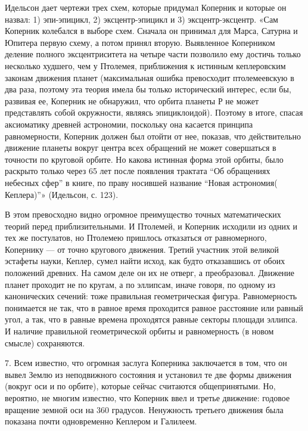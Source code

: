 Идельсон дает чертежи  трех схем, которые придумал  Коперник и которые
он назвал: 1) эпи-эпицикл, 2) эксцентр-эпицикл и 3) эксцентр-эксцентр.
«Сам Коперник колебался в выборе  схем. Сначала он принимал для Марса,
Сатурна  и Юпитера  первую схему,  а потом  принял вторую.  Выявленное
Коперником деление  полного эксцентриситета на четыре  части позволило
ему достичь  только несколько худшего,  чем у Птолемея,  приближения к
истинным  кеплеровским законам  движения  планет (максимальная  ошибка
превосходит  птолемеевскую  в  два  раза,  поэтому  эта  теория  имела
бы  только  исторический  интерес,  если  бы,  развивая  ее,  Коперник
не  обнаружил,  что  орбита  планеты Р  не  может  представлять  собой
окружности, являясь эпициклоидой). Поэтому в итоге, спасая аксиоматику
древней  астрономии, поскольку  она  касается принципа  равномерности,
Коперник  должен  был  отойти   от  нее,  показав,  что  действительно
движение планеты вокруг  центра всех обращений не  может совершаться в
точности по  круговой орбите.  Но какова  истинная форма  этой орбиты,
было  раскрыто  только через  65  лет  после появления  трактата  ``Об
обращениях небесных сфер'' в книге, по праву носившей название ``Новая
астрономия( Кеплера)''» (Идельсон, с. 123).

В этом  превосходно видно огромное преимущество  точных математических
теорий  перед приблизительными.  И  Птолемей, и  Коперник исходили  из
одних  и  тех  же  постулатов,  но  Птолемею  пришлось  отказаться  от
равномерного,  Копернику  ---  от  точно  кругового  движения.  Третий
участник этой великой  эстафеты науки, Кеплер, сумел  найти исход, как
будто отказавшись от  обоих положений древних. На самом деле  он их не
отверг, а  преобразовал. Движение планет  проходит не по кругам,  а по
эллипсам,  иначе  говоря,  по  одному из  канонических  сечений:  тоже
правильная геометрическая фигура. Равномерность понимается не так, что
в равное  время проходится равное  расстояние или равный угол,  а так,
что  в равные  времена проходятся  равные секторы  площади эллипса.  И
наличие  правильной геометрической  орбиты  и  равномерность (в  новом
смысле) сохраняются.

7. Всем  известно, что огромная  заслуга Коперника заключается  в том,
что  он вывел  Землю  из  неподвижного состояния  и  установил те  две
формы  движения (вокруг  оси и  по орбите),  которые сейчас  считаются
общепринятыми.  Но, вероятно,  не многим  известно, что  Коперник ввел
и  третье  движение: годовое  вращение  земной  оси на  360  градусов.
Ненужность третьего движения была показана почти одновременно Кеплером
и Галилеем.

